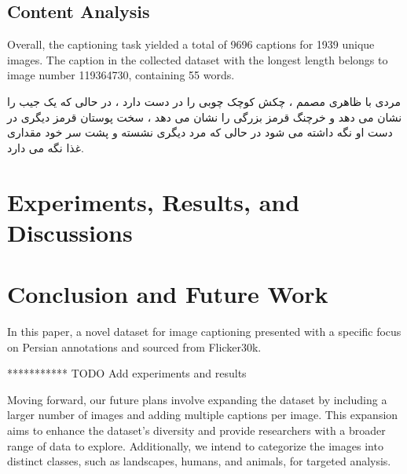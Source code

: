 \documentclass[runningheads]{llncs}
\begin{document}
\subsection{Content Analysis}
Overall, the captioning task yielded a total of 9696 captions for 1939 unique images. The caption in the collected dataset with the longest length belongs to image number 119364730, containing 55 words.

\begin{farsi}
\arabicfont\small
مردی با ظاهری مصمم ، چکش کوچک چوبی را در دست دارد ، در حالی که یک جیب را نشان می دهد و خرچنگ قرمز بزرگی را نشان می دهد ، سخت پوستان قرمز دیگری در دست او نگه داشته می شود در حالی که مرد دیگری نشسته و پشت سر خود مقداری غذا نگه می دارد.
\end{farsi}


\section{Experiments, Results, and Discussions}

\section{Conclusion and Future Work}
In this paper, a novel dataset for image captioning presented with a specific focus on Persian annotations and sourced from Flicker30k.

*********** TODO Add experiments and results

Moving forward, our future plans involve expanding the dataset by including a larger number of images and adding multiple captions per image. This expansion aims to enhance the dataset's diversity and provide researchers with a broader range of data to explore. Additionally, we intend to categorize the images into distinct classes, such as landscapes, humans, and animals, for targeted analysis.
\end{document}
